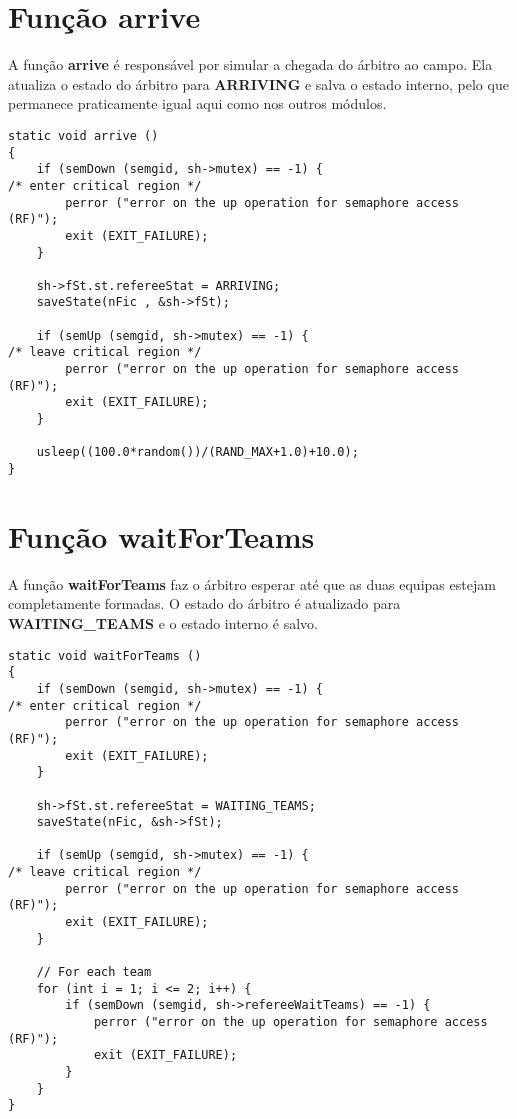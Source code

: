 \documentclass[code,math]{relatorio-deti}
\begin{document}
\section{Função \textbf{arrive}}

A função \textbf{arrive} é responsável por simular a chegada do árbitro ao campo. Ela atualiza o estado do árbitro para \textbf{ARRIVING} e salva o estado interno, pelo que permanece praticamente igual aqui como nos outros módulos. 

\begin{verbatim}
static void arrive ()
{
    if (semDown (semgid, sh->mutex) == -1) {                                                      /* enter critical region */
        perror ("error on the up operation for semaphore access (RF)");
        exit (EXIT_FAILURE);
    }

    sh->fSt.st.refereeStat = ARRIVING;
    saveState(nFic , &sh->fSt);

    if (semUp (semgid, sh->mutex) == -1) {                                                        /* leave critical region */
        perror ("error on the up operation for semaphore access (RF)");
        exit (EXIT_FAILURE);
    }
    
    usleep((100.0*random())/(RAND_MAX+1.0)+10.0);
}
\end{verbatim}

\section{Função \textbf{waitForTeams}}

A função \textbf{waitForTeams} faz o árbitro esperar até que as duas equipas estejam completamente formadas. O estado do árbitro é atualizado para \textbf{WAITING\_TEAMS} e o estado interno é salvo.

\begin{verbatim}
static void waitForTeams ()
{
    if (semDown (semgid, sh->mutex) == -1) {                                                      /* enter critical region */
        perror ("error on the up operation for semaphore access (RF)");
        exit (EXIT_FAILURE);
    }

    sh->fSt.st.refereeStat = WAITING_TEAMS;
    saveState(nFic, &sh->fSt);

    if (semUp (semgid, sh->mutex) == -1) {                                                        /* leave critical region */
        perror ("error on the up operation for semaphore access (RF)");
        exit (EXIT_FAILURE);
    }

    // For each team
    for (int i = 1; i <= 2; i++) {
        if (semDown (semgid, sh->refereeWaitTeams) == -1) {
            perror ("error on the up operation for semaphore access (RF)");
            exit (EXIT_FAILURE);
        }
    }
}
\end{verbatim}
\end{document}
